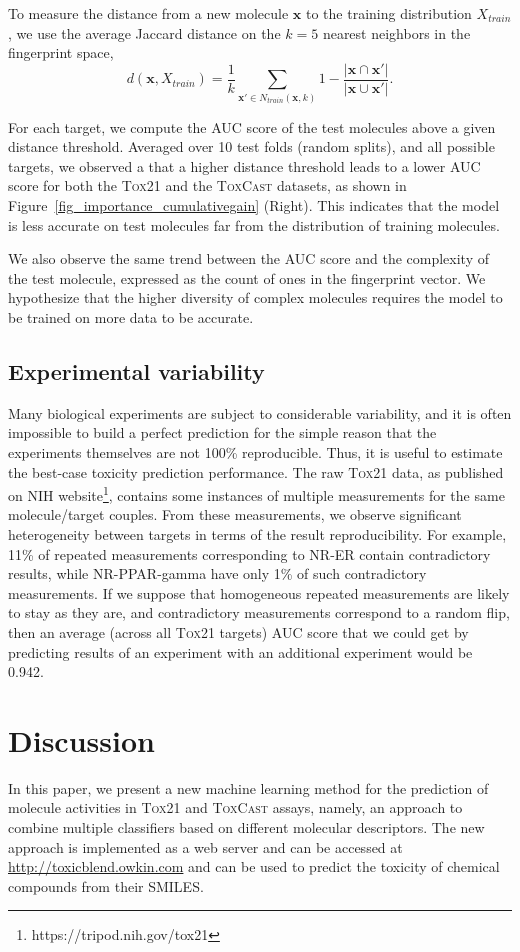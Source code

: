 \documentclass[11pt,a4paper]{article}
\begin{document}
To measure the distance from a new molecule $\mathbf{x}$ to the training distribution $X_{train}$, 
we use the average Jaccard distance on the $k=5$ nearest neighbors in the fingerprint space, 
$$ d(\mathbf{x},X_{train}) = \frac{1}{k}\sum_{\mathbf{x'} \in N_{train}(\mathbf{x}, k)}{1 - \frac{|\mathbf{x} \cap \mathbf{x'}|}{|\mathbf{x} \cup \mathbf{x'}|}}.$$

For each target, we compute the AUC score of the test molecules above a given distance threshold.
Averaged over 10 test folds (random splits), and all possible targets, we observed a that a higher 
distance threshold leads to a lower AUC score for both the \textsc{Tox21} and the \textsc{ToxCast} 
datasets, as shown in Figure~\ref{fig_importance_cumulativegain} (Right). This indicates that the model is less accurate on 
test molecules far from the distribution of training molecules. 

We also observe the same trend between the AUC score and the complexity of the test molecule, 
expressed as the count of ones in the fingerprint vector. We hypothesize that the higher diversity 
of complex molecules requires the model to be trained on more data to be accurate.

\subsection{Experimental variability}
Many biological experiments are subject to considerable variability, and it is
often impossible to build a perfect prediction for the simple reason that
the experiments themselves are not 100\% reproducible. 
Thus, it is useful to estimate the best-case toxicity prediction performance.  
The raw \textsc{Tox21} data, as published on 
NIH website\footnote{https://tripod.nih.gov/tox21},   
contains some instances of multiple measurements for the same molecule/target
couples. 
From these measurements, we observe significant heterogeneity between 
targets in terms of the result reproducibility. 
For example, 11\% of repeated measurements corresponding to NR-ER
contain contradictory results, while NR-PPAR-gamma have only 1\% of such
contradictory measurements. 
If we suppose that homogeneous repeated measurements are likely
to stay as they are, and contradictory measurements correspond to a random flip,
then an average (across all \textsc{Tox21} targets) AUC score that we could get by
predicting results of an experiment with an additional experiment would be 0.942.   

\section{Discussion}
In this paper, we present a new machine learning method for the prediction of
molecule activities in \textsc{Tox21} and \textsc{ToxCast} assays, 
namely, an approach to combine  multiple classifiers based on different molecular
descriptors. The new approach is implemented as a web server and can be accessed
at \url{http://toxicblend.owkin.com} and can be used to predict the toxicity of
chemical compounds from their SMILES.      
\end{document}
